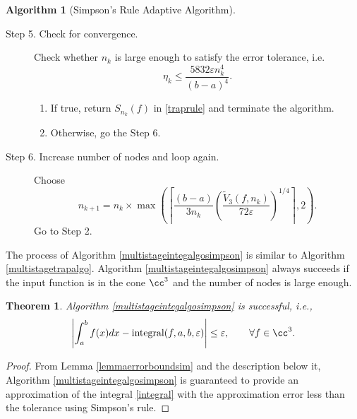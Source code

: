 \documentclass{iitthesis}
\newtheorem{theorem}{Theorem}
\theoremstyle{definition}
\newtheorem{algo}{Algorithm}
\theoremstyle{remark}
\begin{document}
\begin{algo} [Simpson's Rule Adaptive Algorithm]
\begin{description}
\item[Step 5. Check for convergence.] Check whether $n_k$ is large enough to satisfy the error tolerance, i.e.
    \begin{equation*}
        \eta_{k} \le \frac{5832\varepsilon n_k^4}{(b-a)^4}.
    \end{equation*}

    \begin{enumerate}[label=\alph*)]
      \item If true, return $S_{n_k}(f)$ in \eqref{traprule} and terminate the algorithm.
      \item Otherwise, go the Step 6.
    \end{enumerate}


\item[Step 6. Increase number of nodes and loop again.] Choose
$$
n_{k+1}=n_k\times\max\left(\left\lceil\frac{(b-a)}{3n_{k}}\left(\frac{\widetilde{V}_3(f,n_k)}{72\varepsilon}\right)^{1/4}\right\rceil,2\right).
$$
Go to Step 2.
\end{description}
\end{algo}

The process of Algorithm \ref{multistageintegalgosimpson} is similar to Algorithm \ref{multistagetrapalgo}. Algorithm \ref{multistageintegalgosimpson} always succeeds if the input function is in the cone $\cc^3$ and the number of nodes is large enough.
\begin{theorem}\label{thmSimpson}
    Algorithm \ref{multistageintegalgosimpson} is successful, i.e.,
    \begin{equation*}
      \left|\int_{a}^{b}f(x)dx-\textup{integral}(f,a,b,\varepsilon)\right|\le\varepsilon, \qquad \forall f\in \cc^3.
    \end{equation*}
\end{theorem}
\begin{proof}
 From Lemma \ref{lemmaerrorboundsim} and the description below it, Algorithm \ref{multistageintegalgosimpson} is guaranteed to provide an approximation of the integral \eqref{integral} with the approximation error less than the tolerance using Simpson's rule.
\end{proof}
\end{document}
